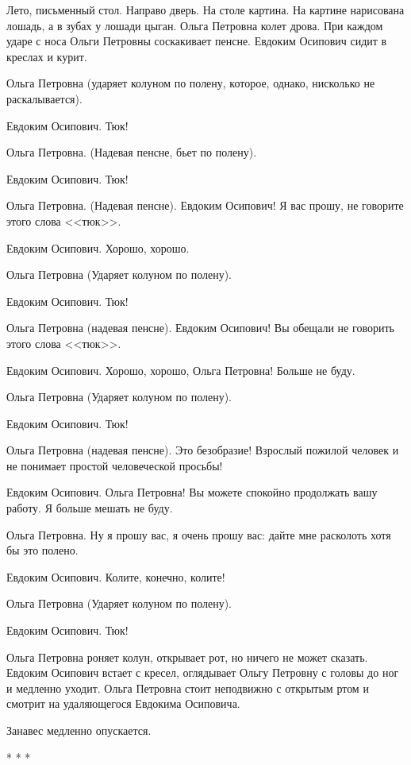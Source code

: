 Лето, письменный стол. Направо дверь. На столе картина. На картине нарисована лошадь, а в зубах у лошади цыган. Ольга Петровна колет дрова. При каждом ударе с носа Ольги Петровны соскакивает пенсне. Евдоким Осипович сидит в креслах и курит.

Ольга Петровна (ударяет колуном по полену, которое, однако, нисколько не раскалывается).

Евдоким Осипович. Тюк!

Ольга Петровна. (Надевая пенсне, бьет по полену).

Евдоким Осипович. Тюк!

Ольга Петровна. (Надевая пенсне). Евдоким Осипович! Я вас прошу, не говорите этого слова <<тюк>>.

Евдоким Осипович. Хорошо, хорошо.

Ольга Петровна (Ударяет колуном по полену).

Евдоким Осипович. Тюк!

Ольга Петровна (надевая пенсне). Евдоким Осипович! Вы обещали не говорить этого слова <<тюк>>.

Евдоким Осипович. Хорошо, хорошо, Ольга Петровна! Больше не буду.

Ольга Петровна (Ударяет колуном по полену).

Евдоким Осипович. Тюк!

Ольга Петровна (надевая пенсне). Это безобразие! Взрослый пожилой человек и не понимает простой человеческой просьбы!

Евдоким Осипович. Ольга Петровна! Вы можете спокойно продолжать вашу работу. Я больше мешать не буду.

Ольга Петровна. Ну я прошу вас, я очень прошу вас: дайте мне расколоть хотя бы это полено.

Евдоким Осипович. Колите, конечно, колите!

Ольга Петровна (Ударяет колуном по полену).

Евдоким Осипович. Тюк!

Ольга Петровна роняет колун, открывает рот, но ничего не может сказать. Евдоким Осипович встает с кресел, оглядывает Ольгу Петровну с головы до ног и медленно уходит. Ольга Петровна стоит неподвижно с открытым ртом и смотрит на удаляющегося Евдокима Осиповича.

\begin{center}
Занавес медленно опускается.
\end{center}


\begin{center}
* * *
\end{center}
